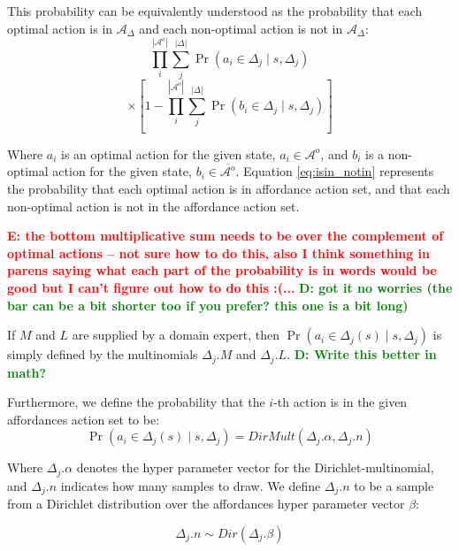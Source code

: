 \documentclass[conference]{IEEEtran}
\newcommand{\dnote}[1]{\textcolor{Green}{\textbf{D: #1}}}
\newcommand{\enote}[1]{\textcolor{Red}{\textbf{E: #1}}}
\begin{document}
This probability can be equivalently understood as the probability that each optimal action is in $\mathcal{A}_{\Delta}$ and each non-optimal action is not in $\mathcal{A}_{\Delta}$:
\begin{equation*}
\prod_i^{|\mathcal{A}^o|} \sum_j^{|\Delta|} \Pr(a_i \in \Delta_j \mid s, \Delta_j)\end{equation*}
\begin{equation}
\times \left[1 - \prod_i^{|\overline{\mathcal{A}^o}|} \sum_j^{|\Delta|} \Pr(b_i \in \Delta_j \mid s, \Delta_j)\right]
\label{eq:isin_notin}
\end{equation}

Where $a_i$ is an optimal action for the given state, $a_i \in \mathcal{A}^o$, and $b_i$ is a non-optimal action for the given state, $b_i \in \overline{\mathcal{A}^o}$. Equation \ref{eq:isin_notin} represents the probability that each optimal action is in affordance action set, and that each non-optimal action is not in the affordance action set.

\enote{the bottom multiplicative sum needs to be over the complement of optimal actions -- not sure how to do this, also I think something in parens saying what each part of the probability is in words would be good but I can't figure out how to do this :(...}
\dnote{got it no worries (the bar can be a bit shorter too if you prefer? this one is a bit long)}

If $M$ and $L$ are supplied by a domain expert, then $\Pr(a_i \in \Delta_j(s) \mid s, \Delta_j)$ is simply defined by the multinomials $\Delta_j.M$ and $\Delta_j.L$. \dnote{Write this better in math?}


\noindent Furthermore, we define the probability that the $i$-th action is in the given affordances action set to be:
\begin{equation}
\Pr(a_i \in \Delta_j(s) \mid s, \Delta_j) = DirMult(\Delta_j.\alpha, \Delta_j.n)
\end{equation}

\noindent Where $\Delta_j.\alpha$ denotes the hyper parameter vector for the Dirichlet-multinomial, and $\Delta_j.n$ indicates how many samples to draw. We define $\Delta_j.n$ to be a sample from a Dirichlet distribution over the affordances hyper parameter vector $\beta$:

\begin{equation}
\Delta_j.n \sim Dir(\Delta_j.\beta)
\end{equation}
\end{document}
